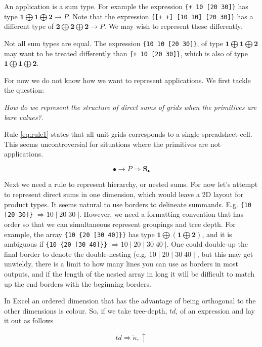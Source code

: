 \documentclass[11pt]{article}
\newcommand{\unit}{\bullet}
\newcommand{\one}{\mathbf{1}}
\newcommand{\two}{\mathbf{2}}
\newcommand{\cell}{\mathbf{S}_\bullet}
\begin{document}
An application is a sum type. For example the expression \verb|{+ 10 [20 30]}| has type $\one \bigoplus \one \bigoplus \two \to P$. Note that the expression \verb|{[+ +] [10 10] [20 30]}| has a different type of $\two \bigoplus \two \bigoplus \two \to P$. We may wish to represent these differently. 

Not all sum types are equal. The expression \verb|{10 10 [20 30]}|,  of type $\one \bigoplus \one \bigoplus \two$ may want to be treated differently than \verb|{+ 10 [20 30]}|, which is also of type $\one \bigoplus \one \bigoplus \two$.

For now we do not know how we want to represent applications. We first tackle the question:


\textit{How do we represent the structure of direct sums of grids when the primitives are bare values?}. 

Rule \ref{eq:rule1} states that all unit grids corresponds to a single spreadsheet cell. This seems uncontroversial for situations where the primitives are not applications.

\begin{equation} 
\unit \to P \Rightarrow \cell \label{eq:rule1}
\end{equation}

Next we need a rule to represent hierarchy, or nested sums. For now let's attempt to represent direct sums in one dimension, which would leave a 2D layout for product types. It seems natural to use borders to delineate summands. E.g. \verb|{10 [20 30]}| $\Rightarrow 10 \;|\; 20 \;30\; |$. However, we need a formatting convention that has order so that we can simultaneous represent groupings and tree depth. For example, the array \verb|{10 {20 [30 40]}}| has type $\one \bigoplus (\one \bigoplus \two)$, and it is ambiguous if \verb|{10 {20 [30 40]}}| $\Rightarrow 10 \;|\; 20 \;|\; 30\; 40\; |$. One could double-up the final border to denote the double-nesting (e.g. $10 \;|\; 20 \;|\; 30\; 40\;||$, but this may get unwieldy, there is a limit to how many lines you can use as borders in most outputs, and if the length of the nested array in long it will be difficult to match up the end borders  with the beginning borders. 

In Excel an ordered dimension that has the advantage of being orthogonal to the other dimensions is colour. So, if we take tree-depth, $td$, of an expression and lay it out as follows

\begin{equation} 
 td \Rightarrow \overleftarrow{\kappa}, \uparrow \label{eq:rule2}
\end{equation}
\end{document}
